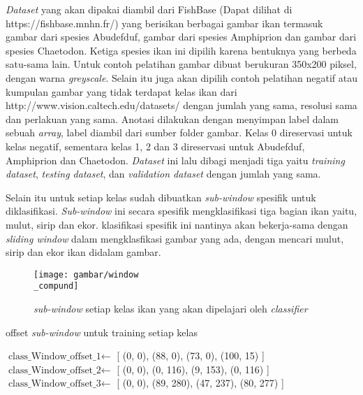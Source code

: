 \textit{Dataset} yang akan dipakai diambil dari FishBase (Dapat dilihat di https://fishbase.mnhn.fr/) yang 
berisikan berbagai gambar ikan termasuk gambar dari spesies Abudefduf, gambar dari spesies 
Amphiprion dan gambar dari spesies Chaetodon. 
Ketiga spesies ikan ini dipilih karena bentuknya yang berbeda satu-sama lain. %
Untuk contoh pelatihan gambar dibuat berukuran 350x200 piksel, 
dengan warna \textit{greyscale}. Selain itu juga akan dipilih contoh 
pelatihan negatif atau kumpulan gambar yang tidak terdapat kelas 
ikan dari http://www.vision.caltech.edu/datasets/ dengan jumlah yang sama, resolusi sama dan perlakuan 
yang sama. Anotasi dilakukan dengan menyimpan label dalam sebuah \textit{array}, label 
diambil dari sumber folder gambar. Kelas 0 direservasi untuk kelas negatif, sementara kelas 
1, 2 dan 3 direservasi untuk Abudefduf, Amphiprion dan Chaetodon.
\textit{Dataset} ini lalu dibagi menjadi tiga yaitu \textit{training dataset}, 
\textit{testing dataset}, dan \emph{validation dataset} dengan jumlah yang sama.

Selain itu untuk setiap kelas sudah dibuatkan \textit{sub-window} spesifik untuk diklasifikasi. 
\textit{Sub-window} ini secara spesifik mengklasifikasi tiga bagian ikan yaitu, mulut, sirip dan ekor. 
klasifikasi spesifik ini nantinya akan bekerja-sama dengan \textit{sliding window} dalam mengklasfikasi 
gambar yang ada, dengan mencari mulut, sirip dan ekor ikan didalam gambar.

\begin{figure}[H]
  \centering{}
	\texttt{[image: gambar/window\\\_compund]}
  \caption{\textit{sub-window} setiap kelas ikan yang akan dipelajari oleh \textit{classifier}}
\end{figure}

\begin{algorithm}
  \caption{offset \textit{sub-window} untuk training setiap kelas}
  \begin{algorithmic}[1]
    \State $\text{{class\_Window\_offset\_1}} \gets$ [
      (0, 0),
      (88, 0), 
      (73, 0),
      (100, 15)
    ]
    \State $\text{{class\_Window\_offset\_2}} \gets$ [
      (0, 0),
      (0, 116), 
      (9, 153),
      (0, 116)
    ]
    \State $\text{{class\_Window\_offset\_3}} \gets$ [
      (0, 0),
      (89, 280), 
      (47, 237),
      (80, 277)
    ]
  \end{algorithmic}
\end{algorithm}

